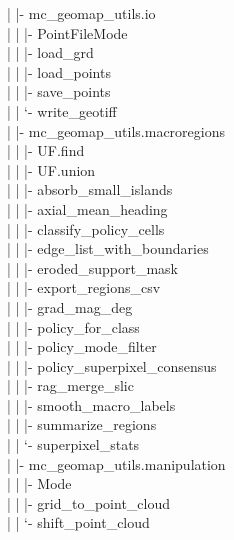 \documentclass[11pt]{article}
\begin{document}
\textcolor{TreeLevelTwo}{|  |- mc\_geomap\_utils.io}\\
\textcolor{TreeLevelThree}{|  |  |- PointFileMode}\\
\textcolor{TreeLevelThree}{|  |  |- load\_grd}\\
\textcolor{TreeLevelThree}{|  |  |- load\_points}\\
\textcolor{TreeLevelThree}{|  |  |- save\_points}\\
\textcolor{TreeLevelThree}{|  |  `- write\_geotiff}\\
\textcolor{TreeLevelTwo}{|  |- mc\_geomap\_utils.macroregions}\\
\textcolor{TreeLevelThree}{|  |  |- UF.find}\\
\textcolor{TreeLevelThree}{|  |  |- UF.union}\\
\textcolor{TreeLevelThree}{|  |  |- absorb\_small\_islands}\\
\textcolor{TreeLevelThree}{|  |  |- axial\_mean\_heading}\\
\textcolor{TreeLevelThree}{|  |  |- classify\_policy\_cells}\\
\textcolor{TreeLevelThree}{|  |  |- edge\_list\_with\_boundaries}\\
\textcolor{TreeLevelThree}{|  |  |- eroded\_support\_mask}\\
\textcolor{TreeLevelThree}{|  |  |- export\_regions\_csv}\\
\textcolor{TreeLevelThree}{|  |  |- grad\_mag\_deg}\\
\textcolor{TreeLevelThree}{|  |  |- policy\_for\_class}\\
\textcolor{TreeLevelThree}{|  |  |- policy\_mode\_filter}\\
\textcolor{TreeLevelThree}{|  |  |- policy\_superpixel\_consensus}\\
\textcolor{TreeLevelThree}{|  |  |- rag\_merge\_slic}\\
\textcolor{TreeLevelThree}{|  |  |- smooth\_macro\_labels}\\
\textcolor{TreeLevelThree}{|  |  |- summarize\_regions}\\
\textcolor{TreeLevelThree}{|  |  `- superpixel\_stats}\\
\textcolor{TreeLevelTwo}{|  |- mc\_geomap\_utils.manipulation}\\
\textcolor{TreeLevelThree}{|  |  |- Mode}\\
\textcolor{TreeLevelThree}{|  |  |- grid\_to\_point\_cloud}\\
\textcolor{TreeLevelThree}{|  |  `- shift\_point\_cloud}\\
\end{document}
